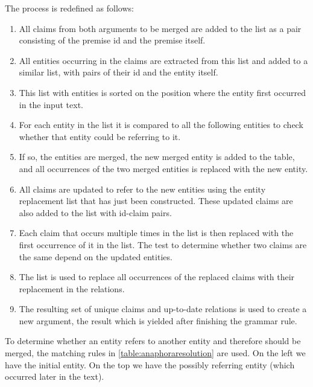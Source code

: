 The process is redefined as follows:

\begin{enumerate}
    \item All claims from both arguments to be merged are added to the list as a pair consisting of the premise id and the premise itself.
    \item All entities occurring in the claims are extracted from this list and added to a similar list, with pairs of their id and the entity itself.
    \item This list with entities is sorted on the position where the entity first occurred in the input text.
    \item For each entity in the list it is compared to all the following entities to check whether that entity could be referring to it.
    \item If so, the entities are merged, the new merged entity is added to the table, and all occurrences of the two merged entities is replaced with the new entity.
    \item All claims are updated to refer to the new entities using the entity replacement list that has just been constructed. These updated claims are also added to the list with id-claim pairs.
    \item Each claim that occurs multiple times in the list is then replaced with the first occurrence of it in the list. The test to determine whether two claims are the same depend on the updated entities.
    \item The list is used to replace all occurrences of the replaced claims with their replacement in the relations.
    \item The resulting set of unique claims and up-to-date relations is used to create a new argument, the result which is yielded after finishing the grammar rule.
\end{enumerate}

\noindent To determine whether an entity refers to another entity and therefore should be merged, the matching rules in \autoref{table:anaphoraresolution} are used. On the left we have the initial entity. On the top we have the possibly referring entity (which occurred later in the text).


